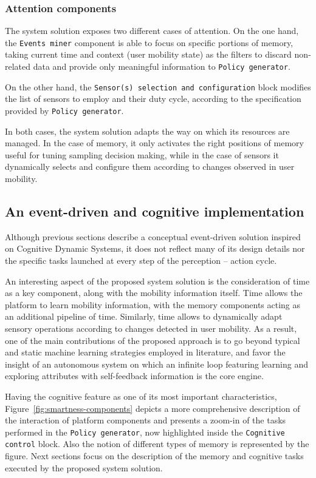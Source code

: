 \documentclass[ENG,PhD]{cinvestav}
\begin{document}
\subsubsection{Attention components}
The system solution exposes two different cases of attention.
On the one hand, the \texttt{Events miner} component is able to focus on specific portions of memory, taking current time and context (user mobility state) as the filters to discard non-related data and provide only meaningful information to \texttt{Policy generator}.

On the other hand, the \texttt{Sensor(s) selection and configuration} block modifies the list of sensors to employ and their duty cycle, according to the specification provided by \texttt{Policy generator}.

In both cases, the system solution adapts the way on which its resources are managed.
In the case of memory, it only activates the right positions of memory useful for tuning sampling decision making, while in the case of sensors it dynamically selects and configure them according to changes observed in user mobility.




\subsection{An event-driven and cognitive implementation}
Although previous sections describe a conceptual event-driven solution inspired on Cognitive Dynamic Systems, it does not reflect many of its design details nor the specific tasks launched at every step of the perception -- action cycle.

An interesting aspect of the proposed system solution is the consideration of time as a key component, along with the mobility information itself.
Time allows the platform to learn mobility information, with the memory components acting as an additional pipeline of time.
Similarly, time allows to dynamically adapt sensory operations according to changes detected in user mobility.
As a result, one of the main contributions of the proposed approach is to go beyond typical and static machine learning strategies employed in literature, and favor the insight of an autonomous system on which an infinite loop featuring learning and exploring attributes with self-feedback information is the core engine.

Having the cognitive feature as one of its most important characteristics, Figure~\ref{fig:smartness-components} depicts a more comprehensive description of the interaction of platform components and presents a zoom-in of the tasks performed in the \texttt{Policy generator}, now highlighted inside the \texttt{Cognitive control} block.
Also the notion of different types of memory is represented by the figure.
Next sections focus on the description of the memory and cognitive tasks executed by the proposed system solution.
\end{document}
